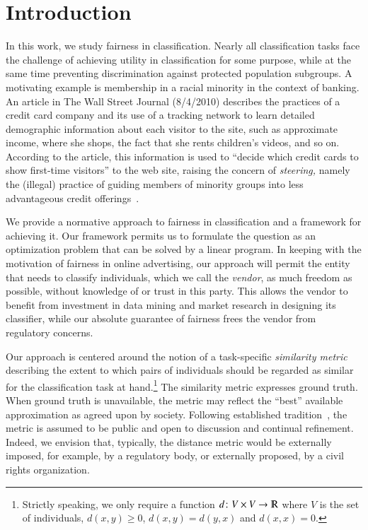 \documentclass[letterpaper,11pt]{article}
\theoremstyle{definition}
\renewcommand{\mathbb}{\varmathbb}
\newcommand{\vendor}{vendor}
\begin{document}
\vfill
\pagebreak

\setcounter{page}{1}

\section{Introduction}
\newcommand{\ep}{Embarrassing Product}

In this work, we study fairness in classification.
Nearly all classification tasks face the challenge of achieving utility in
classification for some purpose, while at the same time preventing
discrimination against protected population subgroups.  A motivating example
is membership in a racial minority in the context of banking.  An article in
The Wall Street Journal (8/4/2010) describes the practices of a credit card company
and its use of a tracking network %
to learn detailed demographic
information about each visitor to the site, such as approximate income, where
she shops, the fact that she rents children's videos, and so on. According to
the article, this information is used to ``decide which credit cards to show
first-time visitors'' to the web site, raising the concern of {\em steering,}
namely the (illegal) practice of guiding members of minority groups into less
advantageous credit offerings~\cite{WSJ:8-4-10}.

We provide a normative approach to fairness in classification and a
framework for achieving it.  Our framework permits us to formulate the
question as an optimization problem that can be solved by a linear program.
In keeping with the motivation of fairness in online advertising, our approach
will permit the entity that needs to classify individuals, which we call the
{\it \vendor{}}, as much freedom as possible, without knowledge of or trust in
this party.  This allows the \vendor{} to benefit from investment in data
mining and market research in designing its classifier, while our absolute
guarantee of fairness frees the \vendor{} from regulatory concerns.

Our approach is centered around the notion of a task-specific {\em
  similarity metric} describing the extent to which pairs of
individuals should be regarded as similar for the classification task
at hand.\footnote{%
Strictly speaking, we only require a function $d\colon
  V\times V\to \mathbb{R}$ where $V$ is the set of individuals,
  $d(x,y)\ge 0$, $d(x,y)=d(y,x)$ and $d(x,x)=0.$}
The similarity metric expresses ground truth.
When ground truth
is unavailable, the metric may reflect the ``best'' available
approximation as agreed upon by society.  Following established
tradition~\cite{Rawls01}, the metric is assumed to be public and open
to discussion and continual refinement.  Indeed, we envision that,
typically, the distance metric would be externally imposed, for
example, by a regulatory body, or externally proposed, by a civil
rights organization.
\end{document}
